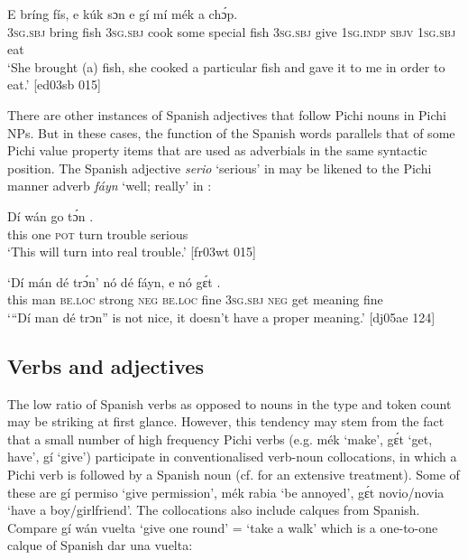 \ea%
    \label{ex:key:1705}
    \gll E    bríng  fís,  e    kúk    sɔn      \textstylePichiexamplebold{\textmd{,}}
e    gí  mí    mék    a    chɔ́p.\\
\textsc{3sg.sbj}  bring  fish  \textsc{3sg.sbj}  cook  some  special  fish
\textsc{3sg.sbj}  give  \textsc{1sg.indp}  \textsc{sbjv}    \textsc{1sg.sbj}  eat\\

\glt ‘She brought (a) fish, she cooked a particular fish and gave it to me 
in order to eat.’ [ed03sb 015]
\z

There are other instances of Spanish adjectives that follow Pichi nouns in Pichi NPs. But in these cases, the function of the Spanish words parallels that of some Pichi value property items that are used as adverbials in the same syntactic position. The Spanish adjective \textit{serio} ‘serious’ in  may be likened to the Pichi manner adverb \textit{fáyn} ‘well; really’ in :


\ea%
    \label{ex:key:1706}
    \gll Dí  wán    go  tɔ́n      .\\
this  one    \textsc{pot}  turn    trouble  serious\\

\glt ‘This will turn into real trouble.’ [fr03wt 015]
\z


\ea%
    \label{ex:key:1707}
    \gll ‘Dí    mán    dé    trɔ́n’  nó  dé    fáyn,  e    nó  gɛ́t
    . \\
 this  man    \textsc{be.loc}  strong  \textsc{neg}  \textsc{be.loc}  fine    \textsc{3sg.sbj}  \textsc{neg}  get
meaning    fine\\

\glt ‘“Dí man dé trɔn” is not nice, it doesn’t have a proper meaning.’ [dj05ae 124]
\z

\subsection{Verbs and adjectives}\label{sec:13.2.2}

The low ratio of Spanish verbs as opposed to nouns in the type and token count may be striking at first glance. However, this tendency may stem from the fact that a small number of high frequency Pichi verbs (e.g. mék ‘make’, gɛ́t ‘get, have’, gí ‘give’) participate in conventionalised verb-noun collocations, {\fff} in which a Pichi verb is followed by a Spanish noun (cf.  for an extensive treatment). Some of these are gí permiso ‘give permission’, mék rabia ‘be annoyed’, gɛ́t novio/novia ‘have a boy/girlfriend’. The collocations also include calques from Spanish. Compare gí wán vuelta ‘give one round’ = ‘take a walk’ which is a one-to-one calque of Spanish dar una vuelta:


